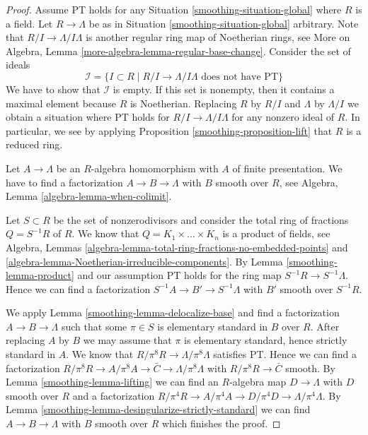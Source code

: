 \begin{proof}

Assume PT holds for any Situation \ref{smoothing-situation-global} where $R$ is a field.
Let $R \to \Lambda$ be as in Situation \ref{smoothing-situation-global} arbitrary.
Note that $R/I \to \Lambda/I\Lambda$ is another regular ring map
of Noetherian rings, see
More on Algebra, Lemma \ref{more-algebra-lemma-regular-base-change}.
Consider the set of ideals
$$
\mathcal{I} = \{I \subset R \mid R/I \to \Lambda/I\Lambda
\text{ does not have PT}\}
$$
We have to show that $\mathcal{I}$ is empty. If this set is nonempty,
then it contains a maximal element because $R$ is Noetherian.
Replacing $R$ by $R/I$ and $\Lambda$ by $\Lambda/I$ we obtain a
situation where PT holds for $R/I \to \Lambda/I\Lambda$ for any
nonzero ideal of $R$. In particular, we see by applying
Proposition \ref{smoothing-proposition-lift}
that $R$ is a reduced ring.

\medskip\noindent
Let $A \to \Lambda$ be an $R$-algebra homomorphism with $A$ of
finite presentation. We have to find a factorization $A \to B \to \Lambda$
with $B$ smooth over $R$, see Algebra, Lemma \ref{algebra-lemma-when-colimit}.

\medskip\noindent
Let $S \subset R$ be the set of nonzerodivisors and
consider the total ring of fractions $Q = S^{-1}R$ of $R$. We know that
$Q = K_1 \times \ldots \times K_n$ is a product of fields, see
Algebra, Lemmas \ref{algebra-lemma-total-ring-fractions-no-embedded-points} and
\ref{algebra-lemma-Noetherian-irreducible-components}.
By Lemma \ref{smoothing-lemma-product} and our assumption
PT holds for the ring map $S^{-1}R \to S^{-1}\Lambda$.
Hence we can find a factorization $S^{-1}A \to B' \to S^{-1}\Lambda$
with $B'$ smooth over $S^{-1}R$.

\medskip\noindent
We apply Lemma \ref{smoothing-lemma-delocalize-base}
and find a factorization $A \to B \to \Lambda$ such that
some $\pi \in S$ is elementary standard in $B$ over $R$.
After replacing $A$ by $B$ we may assume that $\pi$ is
elementary standard, hence strictly standard in $A$. We know that
$R/\pi^8R \to \Lambda/\pi^8\Lambda$ satisfies PT.
Hence we can find a factorization
$R/\pi^8 R \to A/\pi^8A \to \bar C \to \Lambda/\pi^8\Lambda$
with $R/\pi^8 R \to \bar C$ smooth. By
Lemma \ref{smoothing-lemma-lifting}
we can find an $R$-algebra map $D \to \Lambda$ with $D$ smooth over $R$
and a factorization
$R/\pi^4 R \to A/\pi^4A \to D/\pi^4D \to \Lambda/\pi^4\Lambda$.
By Lemma \ref{smoothing-lemma-desingularize-strictly-standard}
we can find $A \to B \to \Lambda$ with $B$ smooth over $R$
which finishes the proof.
\end{proof}

